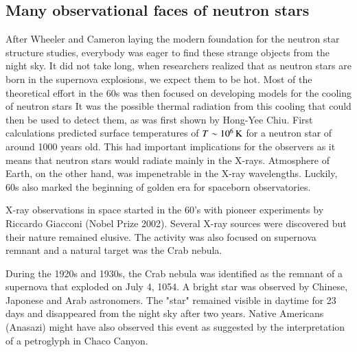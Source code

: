 \subsection{Many observational faces of neutron stars}

After Wheeler and Cameron laying the modern foundation for the neutron star structure studies, everybody was eager to find these strange objects from the night sky.
It did not take long, when researchers realized that as neutron stars are born in the supernova explosions, we expect them to be hot.
Most of the theoretical effort in the 60s was then focused on developing models for the cooling of neutron stars\cite{Stabler60, Chiu64, Morton64, CS64, BW65a, BW65b, TC66}
It was the possible thermal radiation from this cooling that could then be used to detect them, as was first shown by Hong-Yee Chiu\cite{Chiu64}.
First calculations predicted surface temperatures of $T \sim 10^6 \, \mathrm{K}$ for a neutron star of around 1000 years old.
This had important implications for the observers as it means that neutron stars would radiate mainly in the X-rays.
Atmosphere of Earth, on the other hand, was impenetrable in the X-ray wavelengths.
Luckily, 60s also marked the beginning of golden era for spaceborn observatories.

X-ray observations in space started in the 60’s with pioneer experiments by Riccardo Giacconi (Nobel Prize 2002).\cite{GGP62}
Several X-ray sources were discovered but their nature remained elusive.
The activity was also focused on supernova remnant and a natural target was the Crab nebula.

During the 1920s and 1930s, the Crab nebula was identified as the remnant of a supernova that exploded on July 4, 1054.
A bright star was observed by Chinese, Japonese and Arab astronomers. 
The "star" remained visible in daytime for 23 days and disappeared from the night sky after two years.
Native Americans (Anasazi) might have also observed this event as suggested by the interpretation of a petroglyph in Chaco Canyon.

